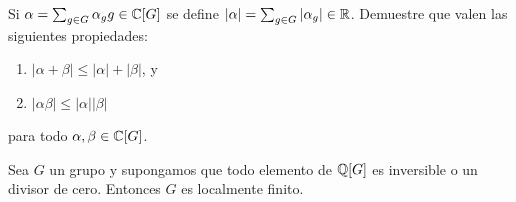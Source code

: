 
\begin{exercise}
	\label{exa:norma}
	Si $\alpha=\sum_{g\in G}\alpha_gg\in\mathbb{C}[G]$ se define $|\alpha|=\sum_{g\in
	G}|\alpha_g|\in\mathbb{R}$. Demuestre que valen las siguientes propiedades:
	\begin{enumerate}
		\item $|\alpha+\beta|\leq|\alpha|+|\beta|$, y 
		\item $|\alpha\beta|\leq|\alpha||\beta|$ 
	\end{enumerate}
	para todo $\alpha,\beta\in\mathbb{C}[G]$.
\end{exercise}

\begin{theorem}
	\label{thm:FormanekQ}
	Sea $G$ un grupo y supongamos que todo elemento de $\mathbb{Q}[G]$ es inversible o
	un divisor de cero. Entonces $G$ es localmente finito.
\end{theorem}

